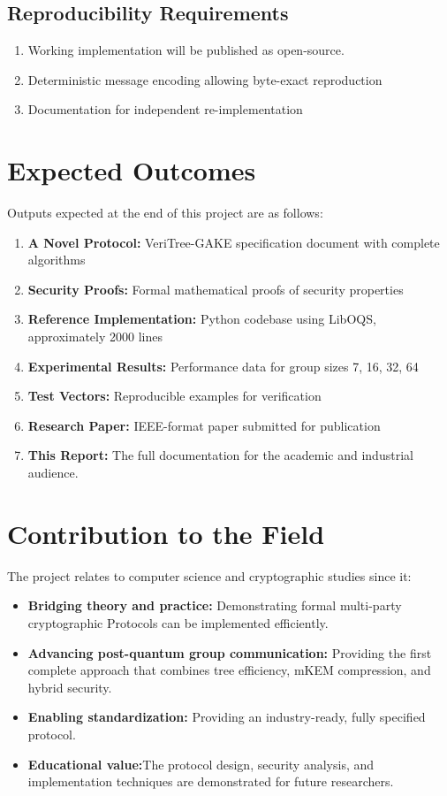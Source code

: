 \documentclass[12pt,a4paper]{report}
\begin{document}
\subsection{Reproducibility Requirements}
\begin{enumerate}
\item Working implementation will be published as open-source.
\item Deterministic message encoding allowing byte-exact reproduction
\item Documentation for independent re-implementation
\end{enumerate}

\section{Expected Outcomes}

Outputs expected at the end of this project are as follows:

\begin{enumerate}
\item \textbf{A Novel Protocol:} VeriTree-GAKE specification document with complete algorithms
\item \textbf{Security Proofs:} Formal mathematical proofs of security properties
\item \textbf{Reference Implementation:} Python codebase using LibOQS, approximately 2000 lines
\item \textbf{Experimental Results:} Performance data for group sizes 7, 16, 32, 64
\item \textbf{Test Vectors:} Reproducible examples for verification
\item \textbf{Research Paper:} IEEE-format paper submitted for publication
\item \textbf{This Report:} The full documentation for the academic and industrial audience.
\end{enumerate}

\section{Contribution to the Field}

The project relates to computer science and cryptographic studies since it:

\begin{itemize}
\item \textbf{Bridging theory and practice:} Demonstrating formal multi-party cryptographic Protocols can be implemented efficiently.
\item \textbf{Advancing post-quantum group communication:} Providing the first complete approach that combines tree efficiency, mKEM compression, and hybrid security.
\item \textbf{Enabling standardization:} Providing an industry-ready, fully specified protocol.
\item \textbf{Educational value:}The protocol design, security analysis, and implementation techniques are demonstrated for future researchers.
\end{itemize}
\end{document}
